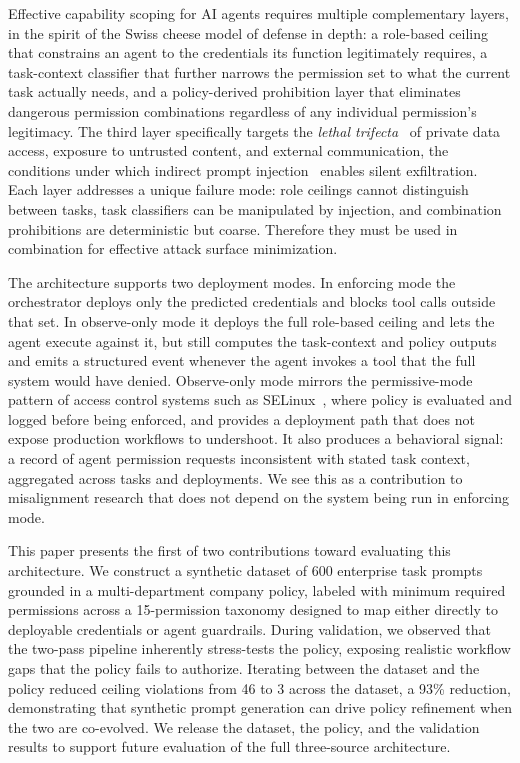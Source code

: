 \documentclass{article}
\theoremstyle{plain}
\theoremstyle{definition}
\theoremstyle{remark}
\begin{document}
Effective capability scoping for AI agents requires multiple complementary layers, in the spirit of the Swiss cheese model of defense in depth: a role-based ceiling that constrains an agent to the credentials its function legitimately requires, a task-context classifier that further narrows the permission set to what the current task actually needs, and a policy-derived prohibition layer that eliminates dangerous permission combinations regardless of any individual permission's legitimacy. The third layer specifically targets the \emph{lethal trifecta}~\citep{willison2025trifecta} of private data access, exposure to untrusted content, and external communication, the conditions under which indirect prompt injection~\citep{greshake2023more} enables silent exfiltration. Each layer addresses a unique failure mode: role ceilings cannot distinguish between tasks, task classifiers can be manipulated by injection, and combination prohibitions are deterministic but coarse. Therefore they must be used in combination for effective attack surface minimization.

The architecture supports two deployment modes. In enforcing mode the orchestrator deploys only the predicted credentials and blocks tool calls outside that set. In observe-only mode it deploys the full role-based ceiling and lets the agent execute against it, but still computes the task-context and policy outputs and emits a structured event whenever the agent invokes a tool that the full system would have denied. Observe-only mode mirrors the permissive-mode pattern of access control systems such as SELinux~\citep{smalley2001selinux}, where policy is evaluated and logged before being enforced, and provides a deployment path that does not expose production workflows to undershoot. It also produces a behavioral signal: a record of agent permission requests inconsistent with stated task context, aggregated across tasks and 
deployments. We see this as a contribution to misalignment research that does not depend on the system being run in enforcing mode.

This paper presents the first of two contributions toward evaluating this architecture. We construct a synthetic dataset of 600 enterprise task prompts grounded in a multi-department company policy, labeled with minimum required permissions across a 15-permission taxonomy designed to map either directly to deployable credentials or agent guardrails. During validation, we observed that the two-pass pipeline inherently stress-tests the policy, exposing realistic workflow gaps that the policy fails to authorize. Iterating between the dataset and the policy reduced ceiling violations from 46 to 3 across the dataset, a 93\% reduction, demonstrating that synthetic prompt generation can drive policy refinement when the two are co-evolved. We release the dataset, the policy, and the validation results to support future evaluation of the full three-source architecture.
\end{document}
